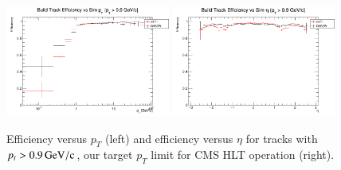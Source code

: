 \documentclass{webofc}
\def\GeVoc{\ensuremath{\,\rm{G}e\rm{V}/c}}
\def\twop{0.48\textwidth}
\def\postfigskip{\vskip-4mm}
\begin{document}
\begin{figure}[thb]
  \centering
  \includegraphics[width=\twop]{figs/phys/SKL-SP_CMSSW_TTbar_PU70_eff_pt_logx_build_pt0p0_SIMVAL.png}
  \hfill
  \includegraphics[width=\twop]{figs/phys/SKL-SP_CMSSW_TTbar_PU70_eff_eta_build_pt0p9_SIMVAL.png}
  \postfigskip

  \caption{Efficiency versus $p_T$ (left) and efficiency versus $\eta$ for
    tracks with $p_t>0.9\GeVoc$, our target $p_T$ limit for CMS HLT operation (right).}
  \label{fig:eff-pt-etapt0p9}
\end{figure}

\end{document}
